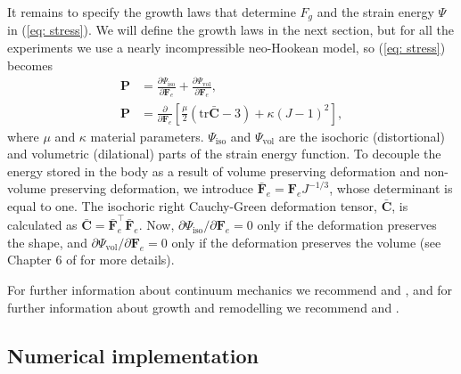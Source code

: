 It remains to specify the growth laws that determine $F_g$ and the strain energy $\Psi$ in 
(\ref{eq: stress}). We will define the growth laws in the next section, but for all the 
experiments we use a nearly incompressible neo-Hookean model, so (\ref{eq: stress}) becomes
\begin{align*}
    \mathbf{P} &= \frac{\partial\Psi_\text{iso}}{\partial \mathbf{F}_e} + \frac{\partial\Psi_\text{vol}}{\partial \mathbf{F}_e}, \\
    \mathbf{P} &= \frac{\partial}{\partial \mathbf{F}_e}\left[\frac{\mu}{2}\left(\mathrm{tr}\mathbf{\bar{C}} - 3\right) + \kappa(J-1)^2\right],
\end{align*}
where $\mu$ and $\kappa$ material parameters. $\Psi_\text{iso}$ and $\Psi_\text{vol}$ are the isochoric (distortional) and volumetric (dilational) parts of the strain energy function. To decouple the energy stored in the body as a result of volume preserving deformation and non-volume preserving deformation, we introduce $\mathbf{\bar{F}}_e = \mathbf{F}_eJ^{-1/3}$, whose determinant is equal to one. The isochoric right Cauchy-Green deformation tensor, $\mathbf{\bar{C}}$, is calculated as $\mathbf{\bar{C}} = \mathbf{\bar{F}}_e^\top \mathbf{\bar{F}}_e$. Now, $\partial\Psi_\text{iso}/\partial \mathbf{F}_e = 0$ only if the deformation preserves the shape, and $\partial\Psi_\text{vol}/\partial \mathbf{F}_e = 0$ only if the deformation preserves the volume (see Chapter 6 of \citep{Holzapfel2002} for more details). \par 
For further information about continuum mechanics we recommend \citep{Marsden1983} and \citep{Holzapfel2002}, and for further information about growth and remodelling we recommend \citep{Goriely2017} and \citep{Yavari2010}.

\subsection{Numerical implementation}
 
